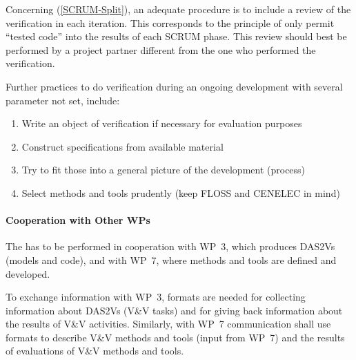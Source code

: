 Concerning (\ref{SCRUM-Split}), an adequate procedure is to include a
review of the verification in each iteration. This corresponds to the
principle of only permit ``tested code'' into the results of each
SCRUM phase. This review should best be performed by a project partner
different from the one who performed the verification.

Further practices to do verification during an ongoing development
with several parameter not set, include: 
\begin{enumerate}
\item Write an object of verification if necessary for evaluation purposes
\item Construct specifications from available material
\item Try to fit those into a general picture of the development (process)
\item Select methods and tools prudently (keep FLOSS and CENELEC in mind)
\end{enumerate}



\paragraph{Cooperation with Other WPs}

The \vv has to be performed in cooperation with WP~3, which
produces DAS2Vs (models and code), and with WP~7, where methods
and tools are defined and developed. 

To exchange information with WP~3, formats are needed for collecting
information about DAS2Vs (V\&V tasks) and for giving back information
about the results of V\&V activities. Similarly, with WP~7
communication shall use formats to describe V\&V methods and tools
(input from WP~7) and the results of evaluations of V\&V methods and
tools.